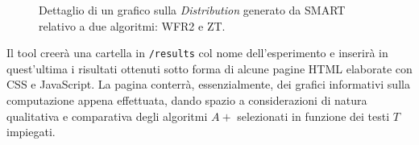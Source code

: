 \begin{itemize}
    \begin{figure}[ht!]
    \centering
    \caption{Dettaglio di un grafico sulla \textit{Distribution} generato da SMART relativo a due algoritmi: WFR2 e ZT.}
    \label{fig:esempio}
\end{figure}
    
    Il tool creerà una cartella in \verb|/results| col nome dell'esperimento e inserirà in quest'ultima i risultati ottenuti sotto forma di alcune pagine HTML elaborate con CSS e JavaScript. La pagina conterrà, essenzialmente, dei grafici informativi sulla computazione appena effettuata, dando spazio a considerazioni di natura qualitativa e comparativa degli algoritmi $A+$ selezionati in funzione dei testi $T$ impiegati.
\end{itemize}

